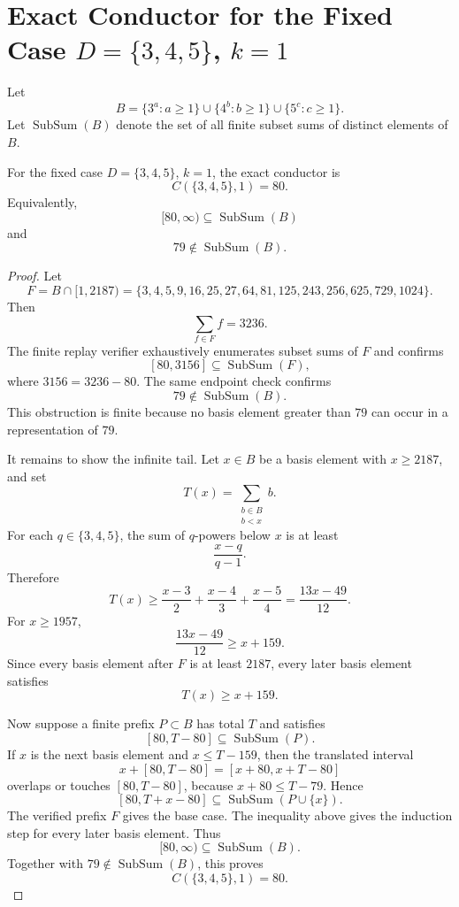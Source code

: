 \section{Exact Conductor for the Fixed Case \(D=\{3,4,5\}\), \(k=1\)}

Let
\[
B=\{3^a:a\ge 1\}\cup\{4^b:b\ge 1\}\cup\{5^c:c\ge 1\}.
\]
Let \(\operatorname{SubSum}(B)\) denote the set of all finite subset sums of distinct
elements of \(B\).

\begin{theorem}
For the fixed case \(D=\{3,4,5\}\), \(k=1\), the exact conductor is
\[
C(\{3,4,5\},1)=80.
\]
Equivalently,
\[
[80,\infty)\subseteq \operatorname{SubSum}(B)
\]
and
\[
79\notin \operatorname{SubSum}(B).
\]
\end{theorem}

\begin{proof}
Let
\[
F=B\cap[1,2187)
=\{3,4,5,9,16,25,27,64,81,125,243,256,625,729,1024\}.
\]
Then
\[
\sum_{f\in F} f=3236.
\]
The finite replay verifier exhaustively enumerates subset sums of \(F\) and confirms
\[
[80,3156]\subseteq \operatorname{SubSum}(F),
\]
where \(3156=3236-80\). The same endpoint check confirms
\[
79\notin \operatorname{SubSum}(B).
\]
This obstruction is finite because no basis element greater than \(79\) can occur in a
representation of \(79\).

It remains to show the infinite tail. Let \(x\in B\) be a basis element with \(x\ge2187\), and set
\[
T(x)=\sum_{\substack{b\in B\\ b<x}}b.
\]
For each \(q\in\{3,4,5\}\), the sum of \(q\)-powers below \(x\) is at least
\[
\frac{x-q}{q-1}.
\]
Therefore
\[
T(x)\ge
\frac{x-3}{2}+\frac{x-4}{3}+\frac{x-5}{4}
=
\frac{13x-49}{12}.
\]
For \(x\ge1957\),
\[
\frac{13x-49}{12}\ge x+159.
\]
Since every basis element after \(F\) is at least \(2187\), every later basis element
satisfies
\[
T(x)\ge x+159.
\]

Now suppose a finite prefix \(P\subset B\) has total \(T\) and satisfies
\[
[80,T-80]\subseteq \operatorname{SubSum}(P).
\]
If \(x\) is the next basis element and \(x\le T-159\), then the translated interval
\[
x+[80,T-80]=[x+80,x+T-80]
\]
overlaps or touches \([80,T-80]\), because \(x+80\le T-79\). Hence
\[
[80,T+x-80]\subseteq \operatorname{SubSum}(P\cup\{x\}).
\]
The verified prefix \(F\) gives the base case. The inequality above gives the induction
step for every later basis element. Thus
\[
[80,\infty)\subseteq \operatorname{SubSum}(B).
\]
Together with \(79\notin\operatorname{SubSum}(B)\), this proves
\[
C(\{3,4,5\},1)=80.
\]
\end{proof}
